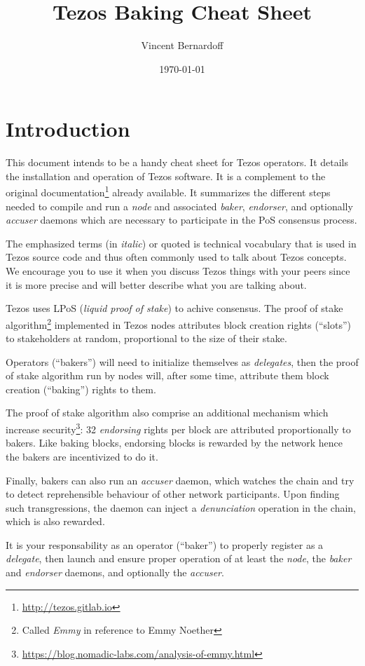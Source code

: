 \documentclass[a4paper,twocolumn,10pt]{article}
\title{Tezos Baking Cheat Sheet}
\date{\today}
\author{Vincent Bernardoff}
\begin{document}
\twocolumn
\maketitle
\tableofcontents
\section{Introduction}

This document intends to be a handy cheat sheet for Tezos
operators. It details the installation and operation of Tezos
software. It is a complement to the original
documentation\footnote{\url{http://tezos.gitlab.io}} already
available. It summarizes the different steps needed to compile and run
a \emph{node} and associated \emph{baker}, \emph{endorser}, and optionally
\emph{accuser} daemons which are necessary to participate in the PoS
consensus process.

The emphasized terms (in \emph{italic}) or quoted is technical
vocabulary that is used in Tezos source code and thus often commonly
used to talk about Tezos concepts. We encourage you to use it when you
discuss Tezos things with your peers since it is more precise and will
better describe what you are talking about.

Tezos uses LPoS (\emph{liquid proof of stake}) to achive
consensus. The proof of stake algorithm\footnote{Called \emph{Emmy} in
  reference to Emmy Noether} implemented in Tezos nodes attributes
block creation rights (“slots”) to stakeholders at random,
proportional to the size of their stake.

Operators (“bakers”) will need to initialize themselves as
\emph{delegates}, then the proof of stake algorithm run by nodes will,
after some time, attribute them block creation (“baking”) rights to
them.

The proof of stake algorithm also comprise an additional mechanism
which increase
security\footnote{\url{https://blog.nomadic-labs.com/analysis-of-emmy.html}}:
32 \emph{endorsing} rights per block are attributed proportionally to
bakers. Like baking blocks, endorsing blocks is rewarded by the
network hence the bakers are incentivized to do it.

Finally, bakers can also run an \emph{accuser} daemon, which watches
the chain and try to detect reprehensible behaviour of other network
participants. Upon finding such transgressions, the daemon can inject
a \emph{denunciation} operation in the chain, which is also rewarded.

It is your responsability as an operator (“baker”) to properly
register as a \emph{delegate}, then launch and ensure proper operation
of at least the \emph{node}, the \emph{baker} and \emph{endorser}
daemons, and optionally the \emph{accuser}.
\end{document}
